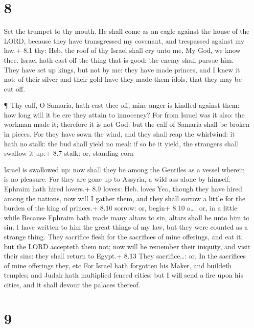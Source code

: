 \hypertarget{section-7}{%
\section{8}\label{section-7}}

 Set the trumpet to thy mouth. He shall come as an eagle
against the house of the LORD, because they have transgressed my
covenant, and trespassed against my law.+ 8.1 thy: Heb. the roof of thy
 Israel shall cry unto me, My God, we know thee.
 Israel hath cast off the thing that is good: the enemy
shall pursue him.  They have set up kings, but not by me:
they have made princes, and I knew it not: of their silver and their
gold have they made them idols, that they may be cut off.

 ¶ Thy calf, O Samaria, hath cast thee off; mine anger is
kindled against them: how long will it be ere they attain to innocency?
 For from Israel was it also: the workman made it; therefore
it is not God: but the calf of Samaria shall be broken in pieces.
 For they have sown the wind, and they shall reap the
whirlwind: it hath no stalk: the bud shall yield no meal: if so be it
yield, the strangers shall swallow it up.+ 8.7 stalk: or, standing corn

 Israel is swallowed up: now shall they be among the
Gentiles as a vessel wherein is no pleasure.  For they are
gone up to Assyria, a wild ass alone by himself: Ephraim hath hired
lovers.+ 8.9 lovers: Heb. loves  Yea, though they have
hired among the nations, now will I gather them, and they shall sorrow a
little for the burden of the king of princes.+ 8.10 sorrow: or, begin+
8.10 a\ldots: or, in a little while  Because Ephraim hath
made many altars to sin, altars shall be unto him to sin. 
I have written to him the great things of my law, but they were counted
as a strange thing.  They sacrifice flesh for the
sacrifices of mine offerings, and eat it; but the LORD accepteth them
not; now will he remember their iniquity, and visit their sins: they
shall return to Egypt.+ 8.13 They sacrifice\ldots: or, In the sacrifices
of mine offerings they, etc  For Israel hath forgotten his
Maker, and buildeth temples; and Judah hath multiplied fenced cities:
but I will send a fire upon his cities, and it shall devour the palaces
thereof.

\hypertarget{section-8}{%
\section{9}\label{section-8}}

